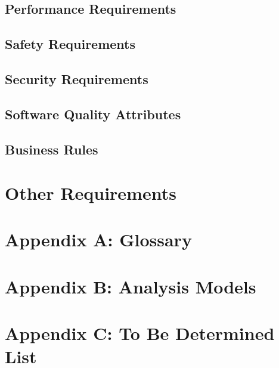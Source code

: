 \documentclass[letterpaper,12pt]{article}
\begin{document}
\subsection{\Large Performance Requirements}
\subsection{\Large Safety Requirements}
\subsection{\Large Security Requirements}
\subsection{\Large Software Quality Attributes}
\subsection{\Large Business Rules}

\section{\LARGE Other Requirements}

\section*{\LARGE Appendix A: Glossary}
\section*{\LARGE Appendix B: Analysis Models}
\section*{\LARGE Appendix C: To Be Determined List}
\end{document}
